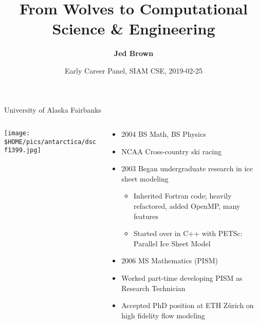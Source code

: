 \documentclass[aspectratio=1610]{beamer}
\title{From Wolves to Computational Science \& Engineering}
\author{{\bf Jed Brown}}
\date{Early Career Panel, SIAM CSE, 2019-02-25}
\begin{document}
\lstset{language=C}
\normalem

\begin{frame}
  \titlepage
\end{frame}

\begin{frame}{University of Alaska Fairbanks}
  \begin{columns}
    \begin{column}{0.6\textwidth}
      \texttt{[image: \$HOME/pics/antarctica/dscf1399.jpg]}
    \end{column}
    \begin{column}{0.4\textwidth}
      \begin{itemize}
      \item 2004 BS Math, BS Physics
      \item NCAA Cross-country ski racing
      \item 2003 Began undergraduate research in ice sheet modeling
        \begin{itemize}
        \item Inherited Fortran code; heavily refactored, added
          OpenMP, many features
        \item Started over in C++ with PETSc: Parallel Ice Sheet Model
        \end{itemize}
      \item 2006 MS Mathematics (PISM)
      \item Worked part-time developing PISM as Research Technician
      \item Accepted PhD position at ETH Z\"urich on high fidelity flow modeling
      \end{itemize}
    \end{column}
  \end{columns}
\end{frame}
\end{document}
